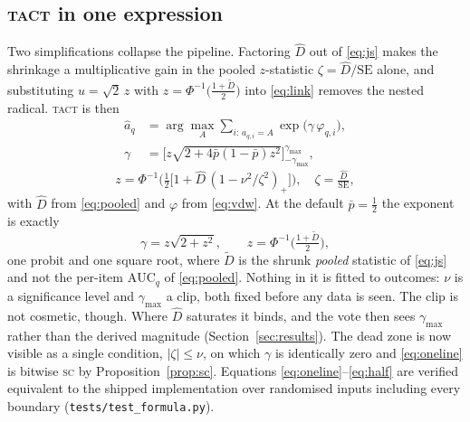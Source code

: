 \documentclass{article}
\newcommand{\Dhat}{\widehat{D}}
\newcommand{\SC}{\textsc{sc}}
\newcommand{\TACT}{\textsc{tact}}
\begin{document}
\subsection{\TACT{} in one expression}\label{sec:oneline}
Two simplifications collapse the pipeline. Factoring $\Dhat$ out of
\eqref{eq:js} makes the shrinkage a multiplicative gain in the pooled
$z$-statistic $\zeta=\Dhat/\mathrm{SE}$ alone, and substituting
$u=\sqrt2\,z$ with $z=\Phi^{-1}\!\big(\tfrac{1+\tilde D}{2}\big)$ into
\eqref{eq:link} removes the nested radical. \TACT{} is then
\begin{equation}\label{eq:oneline}
\boxed{\;
\begin{aligned}
\hat a_q&=\arg\max_A \sum_{i:\,a_{q,i}=A}\exp\big(\gamma\,\varphi_{q,i}\big),\\[2pt]
\gamma&=\Big[z\sqrt{2+4\bar p(1-\bar p)z^{2}}\Big]_{-\gamma_{\max}}^{\gamma_{\max}},
\end{aligned}
\;}
\end{equation}
\begin{equation}\label{eq:oneline2}
z=\Phi^{-1}\!\Big(\tfrac12\big[1+\Dhat\,(1-\nu^{2}/\zeta^{2})_{+}\big]\Big),
\quad \zeta=\tfrac{\Dhat}{\mathrm{SE}},
\end{equation}
with $\Dhat$ from \eqref{eq:pooled} and $\varphi$ from \eqref{eq:vdw}. At the
default $\bar p=\tfrac12$ the exponent is exactly
\begin{equation}\label{eq:half}
\gamma=z\sqrt{2+z^{2}},\qquad z=\Phi^{-1}\!\big(\tfrac{1+\tilde D}{2}\big),
\end{equation}
one probit and one square root, where $\tilde D$ is the shrunk \emph{pooled}
statistic of \eqref{eq:js} and not the per-item $\mathrm{AUC}_q$ of
\eqref{eq:pooled}. Nothing in it is fitted to outcomes: $\nu$ is a
significance level and $\gamma_{\max}$ a clip, both fixed before any data is
seen. The clip is not cosmetic, though. Where $\Dhat$ saturates it binds, and
the vote then sees $\gamma_{\max}$ rather than the derived magnitude
(Section~\ref{sec:results}). The dead zone is now visible as a single condition,
$|\zeta|\le\nu$, on which $\gamma$ is identically zero and \eqref{eq:oneline}
is bitwise \SC{} by Proposition~\ref{prop:sc}. Equations
\eqref{eq:oneline}--\eqref{eq:half} are verified equivalent to the shipped
implementation over randomised inputs including every boundary
(\texttt{tests/test\_formula.py}).
\end{document}
